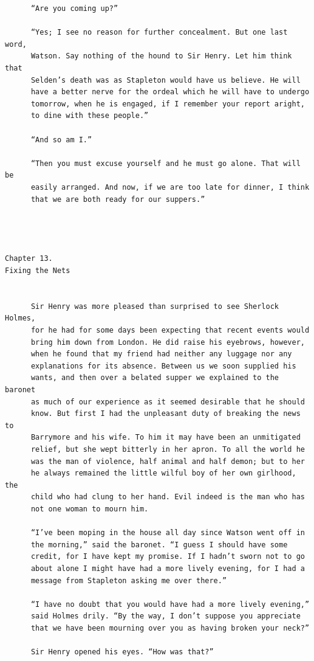 \documentclass{article}
\begin{document}
\begin{verbatim}
      “Are you coming up?”

      “Yes; I see no reason for further concealment. But one last word,
      Watson. Say nothing of the hound to Sir Henry. Let him think that
      Selden’s death was as Stapleton would have us believe. He will
      have a better nerve for the ordeal which he will have to undergo
      tomorrow, when he is engaged, if I remember your report aright,
      to dine with these people.”

      “And so am I.”

      “Then you must excuse yourself and he must go alone. That will be
      easily arranged. And now, if we are too late for dinner, I think
      that we are both ready for our suppers.”




Chapter 13.
Fixing the Nets


      Sir Henry was more pleased than surprised to see Sherlock Holmes,
      for he had for some days been expecting that recent events would
      bring him down from London. He did raise his eyebrows, however,
      when he found that my friend had neither any luggage nor any
      explanations for its absence. Between us we soon supplied his
      wants, and then over a belated supper we explained to the baronet
      as much of our experience as it seemed desirable that he should
      know. But first I had the unpleasant duty of breaking the news to
      Barrymore and his wife. To him it may have been an unmitigated
      relief, but she wept bitterly in her apron. To all the world he
      was the man of violence, half animal and half demon; but to her
      he always remained the little wilful boy of her own girlhood, the
      child who had clung to her hand. Evil indeed is the man who has
      not one woman to mourn him.

      “I’ve been moping in the house all day since Watson went off in
      the morning,” said the baronet. “I guess I should have some
      credit, for I have kept my promise. If I hadn’t sworn not to go
      about alone I might have had a more lively evening, for I had a
      message from Stapleton asking me over there.”

      “I have no doubt that you would have had a more lively evening,”
      said Holmes drily. “By the way, I don’t suppose you appreciate
      that we have been mourning over you as having broken your neck?”

      Sir Henry opened his eyes. “How was that?”


\end{verbatim}
\end{document}
